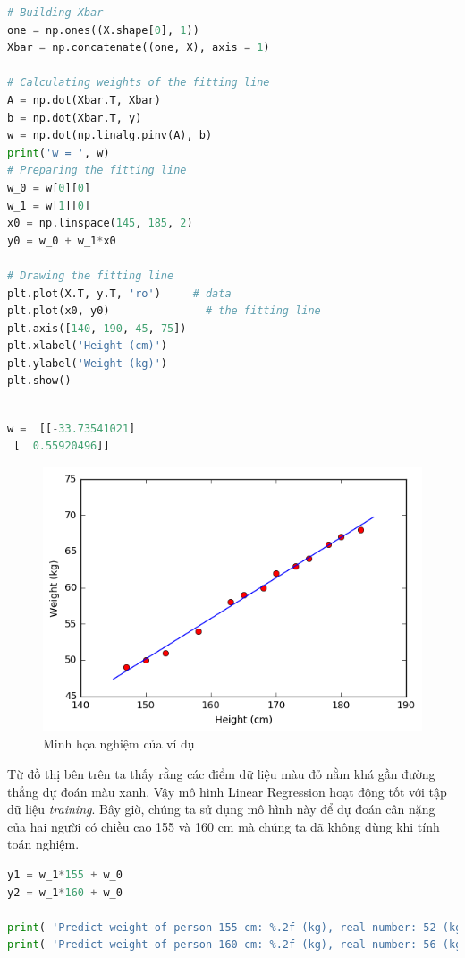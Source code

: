 \begin{lstlisting}[language=Python]
# Building Xbar  
one = np.ones((X.shape[0], 1)) 
Xbar = np.concatenate((one, X), axis = 1) 
 
# Calculating weights of the fitting line  
A = np.dot(Xbar.T, Xbar) 
b = np.dot(Xbar.T, y) 
w = np.dot(np.linalg.pinv(A), b) 
print('w = ', w) 
# Preparing the fitting line  
w_0 = w[0][0] 
w_1 = w[1][0] 
x0 = np.linspace(145, 185, 2) 
y0 = w_0 + w_1*x0 
 
# Drawing the fitting line  
plt.plot(X.T, y.T, 'ro')     # data  
plt.plot(x0, y0)               # the fitting line 
plt.axis([140, 190, 45, 75]) 
plt.xlabel('Height (cm)') 
plt.ylabel('Weight (kg)') 
plt.show() 
 
\end{lstlisting}
 
\begin{lstlisting}[language=Python]
w =  [[-33.73541021] 
 [  0.55920496]] 
\end{lstlisting}
 
 


\begin{figure}
	\centering
	\includegraphics[width = .6\textwidth]{../LR/output_5_1.png}
	\caption{Minh họa nghiệm của ví dụ}
\end{figure}
 
Từ đồ thị bên trên ta thấy rằng các điểm dữ liệu màu đỏ nằm khá gần đường thẳng dự đoán màu xanh. Vậy mô hình Linear Regression hoạt động tốt với tập dữ liệu \textit{training}. Bây giờ, chúng ta sử dụng mô hình này để dự đoán cân nặng của hai người có chiều cao 155 và 160 cm mà chúng ta đã không dùng khi tính toán nghiệm. 
 
 
\begin{lstlisting}[language=Python]
y1 = w_1*155 + w_0 
y2 = w_1*160 + w_0 
 
print( 'Predict weight of person 155 cm: %.2f (kg), real number: 52 (kg)'  %(y1) ) 
print( 'Predict weight of person 160 cm: %.2f (kg), real number: 56 (kg)'  %(y2) ) 
\end{lstlisting}
 

